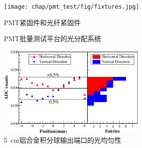 \begin{figure}[htbp]
	\centering
	\texttt{[image: chap/pmt\_test/fig/fixtures.jpg]}
	\caption{PMT紧固件和光纤紧固件}
	\label{fig:pmt_test:fixtures}
\end{figure}

\begin{figure}[htbp]
	\centering
	\caption{PMT批量测试平台的光分配系统}
	\label{fig:pmt_test:light_distribution}
\end{figure}

\begin{figure}[htbp]
	\centering
	\includegraphics[width=0.65\textwidth]{chap/pmt_test/fig/integrationsphere_uniformity.eps}
	\caption{\SI{5}{cm}铝合金积分球输出端口的光均匀性}
	\label{fig:pmt_test:integrationsphere_uniformity}
\end{figure}

